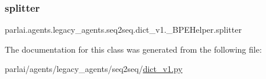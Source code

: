 \subsubsection{\texorpdfstring{splitter}{splitter}}
{\footnotesize\ttfamily parlai.\+agents.\+legacy\+\_\+agents.\+seq2seq.\+dict\+\_\+v1.\+\_\+\+B\+P\+E\+Helper.\+splitter}



The documentation for this class was generated from the following file\+:\begin{DoxyCompactItemize}
\item 
parlai/agents/legacy\+\_\+agents/seq2seq/\hyperlink{dict__v1_8py}{dict\+\_\+v1.\+py}\end{DoxyCompactItemize}

